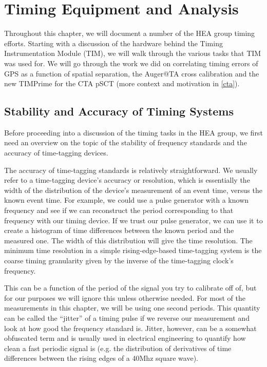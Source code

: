 
\chapter{Timing Equipment and Analysis}
\label{timtiming}
Throughout this chapter, we will document a number of the HEA group timing efforts. Starting with a discussion of the hardware behind the Timing Instrumentation Module (TIM), we will walk through the various tasks that TIM was used for. We will go through the work we did on correlating timing errors of GPS as a function of spatial separation, the Auger@TA cross calibration and the new TIMPrime for the CTA pSCT (more context and motivation in \autoref{cta}).


\section{Stability and Accuracy of Timing Systems}
\label{stabacc}
Before proceeding into a discussion of the timing tasks in the HEA group, we first need an overview on the topic of the stability of frequency standards and the accuracy of time-tagging devices. 

The accuracy of time-tagging standards is relatively straightforward. We usually refer to a time-tagging device's accuracy or resolution, which is essentially the width of the distribution of the device's measurement of an event time, versus the known event time. For example, we could use a pulse generator with a known frequency and see if we can reconstruct the period corresponding to that frequency with our timing device. If we trust our pulse generator, we can use it to create a histogram of time differences between the known period and the measured one. The width of this distribution will give the time resolution. The minimum time resolution in a simple rising-edge-based time-tagging system is the coarse timing granularity given by the inverse of the time-tagging clock's frequency. 

This can be a function of the period of the signal you try to calibrate off of, but for our purposes we will ignore this unless otherwise needed. For most of the measurements in this chapter, we will be using one second periods. This quantity can be called the ``jitter'' of a timing pulse if we reverse our measurement and look at how good the frequency standard is. Jitter, however, can be a somewhat obfuscated term and is usually used in electrical engineering to quantify how clean a fast periodic signal is (e.g. the distribution of derivatives of time differences between the rising edges of a 40Mhz square wave).

